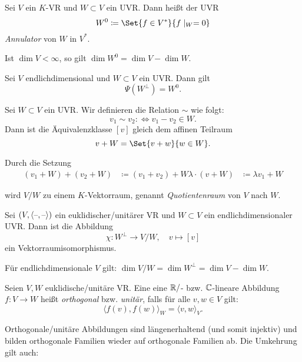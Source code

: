 \documentclass{cheat-sheet}
\begin{document}
\begin{defn}
  Sei $V$ ein $K$-VR und $W \subset V$ ein UVR. Dann heißt der UVR
  \[ W^0 \coloneqq \Set{ f \in V^* }{ f\mid_W = 0 } \]
  \emph{Annulator} von $W$ in $V^*$.
\end{defn}

\begin{bem}
  Ist $\dim V < \infty$, so gilt $\dim W^0 = \dim V - \dim W$.
\end{bem}

\begin{satz}
  Sei $V$ endlichdimensional und $W \subset V$ ein UVR. Dann gilt
  \[ \Psi(W^{\perp}) = W^0. \]
\end{satz}

\begin{defn}
  Sei $W \subset V$ ein UVR. Wir definieren die Relation $\sim$ wie folgt:
  \[ v_1 \sim v_2 :\iff v_1 - v_2 \in W. \]
  Dann ist die Äquivalenzklasse $[v]$ gleich dem affinen Teilraum
  \[ v + W = \Set{ v + w }{ w \in W }. \]

  Durch die Setzung
  \begin{align*}
  (v_1 + W) + (v_2 + W) &\coloneqq (v_1 + v_2) + W
  \lambda \cdot (v + W) &\coloneqq \lambda v_1 + W
  \end{align*}

  wird $V/W$ zu einem $K$-Vektorraum, genannt \emph{Quotientenraum} von $V$ nach $W$.
\end{defn}

\begin{satz}
  Sei $(V, \langle \text{--} , \text{--} \rangle)$ ein euklidischer/unitärer VR und $W \subset V$ ein endlichdimensionaler UVR. Dann ist die Abbildung
  \[ \chi : W^{\perp} \to V/W, \quad v \mapsto [v] \]
  ein Vektorraumisomorphismus.
\end{satz}

\begin{kor}
  Für endlichdimensionale $V$ gilt: $\dim V/W = \dim W^{\perp} = \dim V - \dim W$.
\end{kor}

\begin{defn}
  Seien $V, W$ euklidische/unitäre VR. Eine eine $\mathbb{R}/$- bzw. $\mathbb{C}$-lineare Abbildung $f : V \to W$ heißt \emph{orthogonal} bzw. \emph{unitär}, falls für alle $v, w \in V$ gilt:
  \[ \langle f(v) , f(w) \rangle_W = \langle v , w \rangle_V. \]
\end{defn}

\begin{bem}
  Orthogonale/unitäre Abbildungen sind längenerhaltend (und somit injektiv) und bilden orthogonale Familien wieder auf orthogonale Familien ab. Die Umkehrung gilt auch:
\end{bem}
\end{document}
